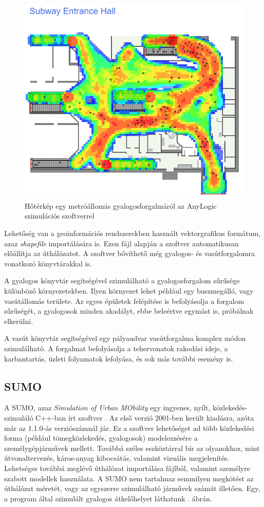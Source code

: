 \begin{figure}[H]
\includegraphics[width=\linewidth]{heatmap.png}
\caption{Hőtérkép egy metróállomás gyalogosforgalmáról az AnyLogic szimulációs szoftverrel\cite{heatmappic}}
\label{fig:heatmp}
\end{figure}

Lehetőség van a geoinformációs rendszerekben használt vektorgrafikus formátum, azaz \textit{shapefile} importálására is. Ezen fájl alapján a szoftver automatikusan
előállítja az úthálózatot. A szoftver bővíthető még gyalogos- és vasútforgalomra vonatkozó könyvtárakkal is.

A gyalogos könyvtár segítségével szimulálható a gyalogosforgalom sűrűsége különböző környezetekben. Ilyen környezet lehet például egy buszmegálló, vagy vasútállomás területe. Az egyes épületek
felépítése is befolyásolja a forgalom sűrűségét, a gyalogosok minden akadályt, ebbe beleértve egymást is, próbálnak elkerülni.

A vasút könyvtár segítségével egy pályaudvar vasútforgalma komplex módon szimulálható. A forgalmat befolyásolja a tehervonatok rakodási ideje, a karbantartás, üzleti folyamatok lefolyása, és sok más további esemény is.

\subsection{SUMO}

A SUMO, azaz \textit{Simulation of Urban MObility} egy ingyenes, nyílt, közlekedés-szimuláló C++-ban írt szoftver \cite{SUMO}. Az első verzió 2001-ben került kiadásra, azóta már az 1.1.0-ás verziószámnál jár. Ez a szoftver lehetőséget ad több közlekedési forma (például tömegközlekedés, gyalogosok)
modelezzésére a személygépjárművek mellett. Továbbá széles eszköztárral bír az olyanokhoz, mint útvonaltervezés, káros-anyag kibocsátás, valamint vizuális megjelenítés.
Lehetséges továbbá meglévő úthálózat importálása fájlból, valamint személyre szabott modellek használata. A SUMO nem tartalmaz semmilyen megkötést az úthálózat méretét, vagy az egyszerre szimulálható járművek számát illetően. Egy, a program által szimulált gyalogos átkelőhelyet láthatunk . ábrán.

